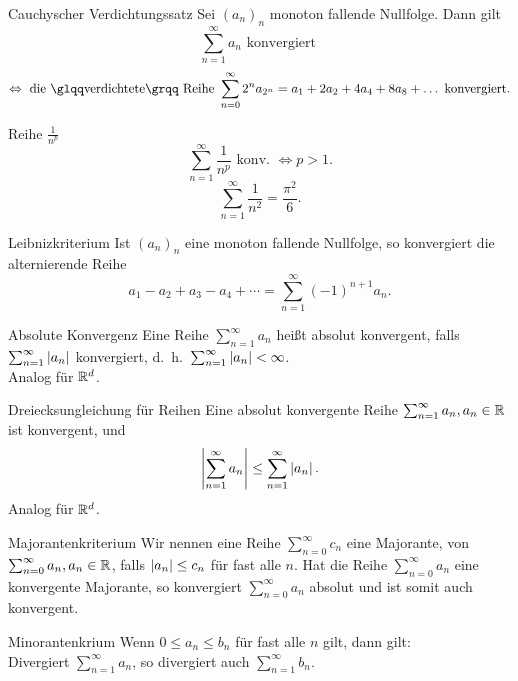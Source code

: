 \documentclass[main.tex]{subfiles}
\begin{document}
\begin{karte}{Cauchyscher Verdichtungssatz}
    Sei \({(a_n)}_n\) monoton fallende 
    Nullfolge. Dann gilt
    \[\sum_{n=1}^{\infty} a_n 
    \text{ konvergiert }\]
    \[\Leftrightarrow \text{ die 
    \gqq{verdichtete} Reihe } 
    \sum_{n=0}^{\infty}2^n a_{2^n} 
    = a_1 + 2a_2 + 4a_4 + 8 a_8 
    + \dots \text{ konvergiert}.\]
\end{karte}
\begin{karte}{Reihe \( \frac{1}{n^p} \)}
    \[ \sum_{n=1}^{\infty} 
    \frac{1}{n^p} \text{ konv. } 
    \Leftrightarrow p>1. \]
    \[ \sum_{n=1}^{\infty} \frac{1}{n^2} 
    = \frac{\pi^2}{6}. \]
\end{karte}
\begin{karte}{Leibnizkriterium}
    Ist \( {(a_n)}_n \) eine monoton 
    fallende Nullfolge, so konvergiert 
    die alternierende Reihe
    \[ a_1 - a_2 + a_3 - a_4 + \cdots 
    = \sum_{n=1}^{\infty} {(-1)}^{n+1} a_n. \]
\end{karte}
\begin{karte}{Absolute Konvergenz}
    Eine Reihe \( \sum_{n=1}^{\infty} a_n \) 
    heißt absolut konvergent, falls 
    \( \sum_{n=1}^{\infty} \left| a_n \right| \) 
    konvergiert, d.\ h.\ 
    \(\sum_{n=1}^{\infty} \left| a_n \right| < \infty \).\\
    Analog für \(\mathbb{R}^d\).
\end{karte}
\begin{karte}{Dreiecksungleichung für Reihen}
    Eine absolut konvergente Reihe 
    \( \sum_{n=1}^{\infty}a_n, a_n \in\mathbb{R} \) 
    ist konvergent, und
\[ \left|  \sum_{n=1}^{\infty}a_n  \right|
    \leq \sum_{n=1}^{\infty}\left| a_n \right|.\]
    Analog für \( \mathbb{R}^d \).
\end{karte}
\begin{karte}{Majorantenkriterium}
    Wir nennen eine Reihe 
    \( \sum_{n=0}^{\infty} c_n \) 
    eine Majorante, von \( \sum_{n=0}^{\infty}
    a_n, a_n\in\mathbb{R} \), falls \( \left| a_n \right| 
    \leq c_n \) für fast alle \(n\).
    Hat die Reihe \( \sum_{n=0}^{\infty}a_n \) 
    eine konvergente Majorante, so konvergiert 
    \( \sum_{n=0}^{\infty}a_n \) absolut und 
    ist somit auch konvergent.
\end{karte}
\begin{karte}{Minorantenkrium}
    Wenn \( 0 \leq a_n \leq b_n \) für fast alle \( n \) 
    gilt, dann gilt:\\
    Divergiert \( \sum_{n=1}^\infty a_n \), so 
    divergiert auch \( \sum_{n=1}^\infty b_n \).
\end{karte}
\end{document}
